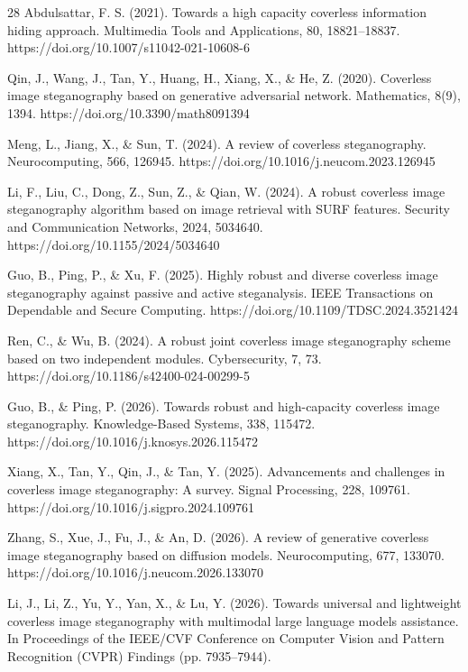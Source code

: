 \documentclass[preprint,12pt]{elsarticle}
\theoremstyle{plain}
\begin{document}
\begin{thebibliography}{28}
Abdulsattar, F. S. (2021). Towards a high capacity coverless information hiding approach. Multimedia Tools and Applications, 80, 18821--18837. https://doi.org/10.1007/s11042-021-10608-6

Qin, J., Wang, J., Tan, Y., Huang, H., Xiang, X., \& He, Z. (2020). Coverless image steganography based on generative adversarial network. Mathematics, 8(9), 1394. https://doi.org/10.3390/math8091394

Meng, L., Jiang, X., \& Sun, T. (2024). A review of coverless steganography. Neurocomputing, 566, 126945. https://doi.org/10.1016/j.neucom.2023.126945

Li, F., Liu, C., Dong, Z., Sun, Z., \& Qian, W. (2024). A robust coverless image steganography algorithm based on image retrieval with SURF features. Security and Communication Networks, 2024, 5034640. https://doi.org/10.1155/2024/5034640

Guo, B., Ping, P., \& Xu, F. (2025). Highly robust and diverse coverless image steganography against passive and active steganalysis. IEEE Transactions on Dependable and Secure Computing. https://doi.org/10.1109/TDSC.2024.3521424

Ren, C., \& Wu, B. (2024). A robust joint coverless image steganography scheme based on two independent modules. Cybersecurity, 7, 73. https://doi.org/10.1186/s42400-024-00299-5

Guo, B., \& Ping, P. (2026). Towards robust and high-capacity coverless image steganography. Knowledge-Based Systems, 338, 115472. https://doi.org/10.1016/j.knosys.2026.115472


Xiang, X., Tan, Y., Qin, J., \& Tan, Y. (2025). Advancements and challenges in coverless image steganography: A survey. Signal Processing, 228, 109761. https://doi.org/10.1016/j.sigpro.2024.109761

Zhang, S., Xue, J., Fu, J., \& An, D. (2026). A review of generative coverless image steganography based on diffusion models. Neurocomputing, 677, 133070. https://doi.org/10.1016/j.neucom.2026.133070

Li, J., Li, Z., Yu, Y., Yan, X., \& Lu, Y. (2026). Towards universal and lightweight coverless image steganography with multimodal large language models assistance. In Proceedings of the IEEE/CVF Conference on Computer Vision and Pattern Recognition (CVPR) Findings (pp. 7935--7944).


\end{thebibliography}
\end{document}
